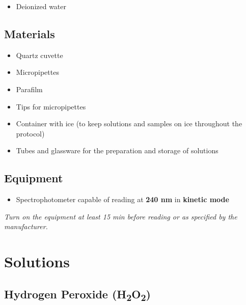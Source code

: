 \documentclass[
  9pt,
  american,
  a5paper,
  extrafontsizes,onecolumn,openright
  ]{memoir}
\providecommand{\tightlist}{%
  \setlength{\itemsep}{0pt}\setlength{\parskip}{0pt}}
\begin{document}
\begin{itemize}
\tightlist
\item
  Deionized water
\end{itemize}

\subsection{Materials}\label{materials}

\begin{itemize}
\tightlist
\item
  Quartz cuvette
\item
  Micropipettes
\item
  Parafilm
\item
  Tips for micropipettes
\item
  Container with ice (to keep solutions and samples on ice throughout the protocol)
\item
  Tubes and glassware for the preparation and storage of solutions
\end{itemize}

\subsection{Equipment}\label{equipment}

\begin{itemize}
\tightlist
\item
  Spectrophotometer capable of reading at \textbf{240 nm} in \textbf{kinetic mode}
\end{itemize}

\begin{greybox}[frametitle=Note]
\emph{Turn on the equipment at least 15 min before reading or as specified by the manufacturer.}

\end{greybox}

\section{Solutions}\label{solutions}

\subsection{\texorpdfstring{Hydrogen Peroxide (H\textsubscript{2}O\textsubscript{2})}{Hydrogen Peroxide (H2O2)}}\label{hydrogen-peroxide-h2o2}
\end{document}
